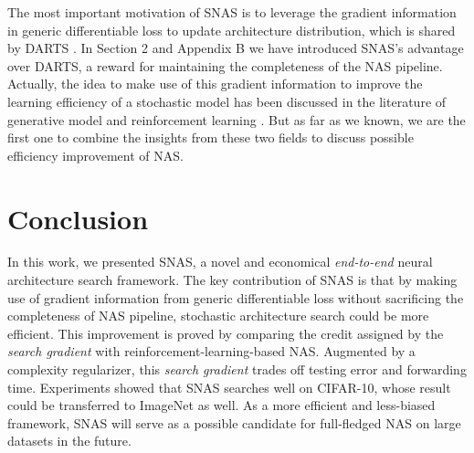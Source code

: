 \documentclass{article} \usepackage{iclr2019_conference,times}
\begin{document}
The most important motivation of SNAS is to leverage the gradient information in generic differentiable loss to update architecture distribution, which is shared by DARTS \citep{liu2018darts}. In Section 2 and Appendix B we have introduced SNAS's advantage over DARTS, a reward for maintaining the completeness of the NAS pipeline. Actually, the idea to make use of this gradient information to improve the learning efficiency of a stochastic model has been discussed in the literature of generative model \citep{gu2015muprop,maddison2016concrete} and reinforcement learning \citep{schmidhuber1990making, arjona2018rudder}. But as far as we known, we are the first one to combine the insights from these two fields to discuss possible efficiency improvement of NAS. 

\section{Conclusion}
In this work, we presented SNAS, a novel and economical \textit{end-to-end} neural architecture search framework. The key contribution of SNAS is that by making use of gradient information from generic differentiable loss without sacrificing the completeness of NAS pipeline, stochastic architecture search could be more efficient. This improvement is proved by comparing the credit assigned by the \textit{search gradient} with reinforcement-learning-based NAS. Augmented by a complexity regularizer, this \textit{search gradient} trades off testing error and forwarding time. Experiments showed that SNAS searches well on CIFAR-10, whose result could be transferred to ImageNet as well. As a more efficient and less-biased framework, SNAS will serve as a possible candidate for full-fledged NAS on large datasets in the future. 




\appendix
\end{document}
